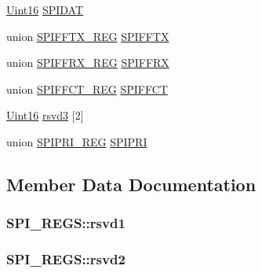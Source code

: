 \begin{DoxyCompactItemize}
\item 
\hyperlink{_d_s_p2833x___device_8h_a59a9f6be4562c327cbfb4f7e8e18f08b}{Uint16} \hyperlink{struct_s_p_i___r_e_g_s_a3ee9ff1897449e7ce0649dc9d5b6cbc7}{S\+P\+I\+D\+A\+T}
\item 
union \hyperlink{union_s_p_i_f_f_t_x___r_e_g}{S\+P\+I\+F\+F\+T\+X\+\_\+\+R\+E\+G} \hyperlink{struct_s_p_i___r_e_g_s_a9910b1c992a5b7c12bac52ce698c8748}{S\+P\+I\+F\+F\+T\+X}
\item 
union \hyperlink{union_s_p_i_f_f_r_x___r_e_g}{S\+P\+I\+F\+F\+R\+X\+\_\+\+R\+E\+G} \hyperlink{struct_s_p_i___r_e_g_s_aee52f5c831dc5d98374a99df663a217a}{S\+P\+I\+F\+F\+R\+X}
\item 
union \hyperlink{union_s_p_i_f_f_c_t___r_e_g}{S\+P\+I\+F\+F\+C\+T\+\_\+\+R\+E\+G} \hyperlink{struct_s_p_i___r_e_g_s_a5d19682be3e07ed1e4d3c49e5030ba50}{S\+P\+I\+F\+F\+C\+T}
\item 
\hyperlink{_d_s_p2833x___device_8h_a59a9f6be4562c327cbfb4f7e8e18f08b}{Uint16} \hyperlink{struct_s_p_i___r_e_g_s_a69fa2bffca81abb1ae3e2eb1aeda9e73}{rsvd3} \mbox{[}2\mbox{]}
\item 
union \hyperlink{union_s_p_i_p_r_i___r_e_g}{S\+P\+I\+P\+R\+I\+\_\+\+R\+E\+G} \hyperlink{struct_s_p_i___r_e_g_s_af723862bb141bfd84490a8916f0105b0}{S\+P\+I\+P\+R\+I}
\end{DoxyCompactItemize}


\subsection{Member Data Documentation}
\hypertarget{struct_s_p_i___r_e_g_s_a0cf11dc145a9cf8ba08002beaca0f59a}{}
\subsubsection[{rsvd1}]{ S\+P\+I\+\_\+\+R\+E\+G\+S\+::rsvd1}\label{struct_s_p_i___r_e_g_s_a0cf11dc145a9cf8ba08002beaca0f59a}
\hypertarget{struct_s_p_i___r_e_g_s_a21b7d89fa6a29f296be31fc876c16b80}{}
\subsubsection[{rsvd2}]{ S\+P\+I\+\_\+\+R\+E\+G\+S\+::rsvd2}\label{struct_s_p_i___r_e_g_s_a21b7d89fa6a29f296be31fc876c16b80}
\hypertarget{struct_s_p_i___r_e_g_s_a69fa2bffca81abb1ae3e2eb1aeda9e73}{}
